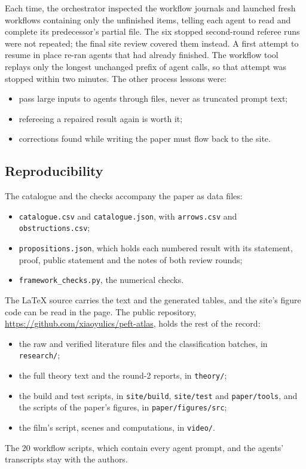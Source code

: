 Each time, the orchestrator inspected the workflow journals and launched fresh workflows containing only the unfinished items, telling each agent to read and complete its predecessor's partial file. The six stopped second-round referee runs were not repeated; the final site review covered them instead. A first attempt to resume in place re-ran agents that had already finished. The workflow tool replays only the longest unchanged prefix of agent calls, so that attempt was stopped within two minutes. The other process lessons were:

\begin{itemize}
\item pass large inputs to agents through files, never as truncated prompt text;
\item refereeing a repaired result again is worth it;
\item corrections found while writing the paper must flow back to the site.
\end{itemize}

\subsection{Reproducibility}

The catalogue and the checks accompany the paper as data files:

\begin{itemize}
\item \texttt{catalogue.csv} and \texttt{catalogue.json}, with \texttt{arrows.csv} and \texttt{obstructions.csv};
\item \texttt{propositions.json}, which holds each numbered result with its statement, proof, public statement and the notes of both review rounds;
\item \texttt{framework\_checks.py}, the numerical checks.
\end{itemize}

The LaTeX source carries the text and the generated tables, and the site's figure code can be read in the page. The public repository, \url{https://github.com/xiaoyulics/peft-atlas}, holds the rest of the record:

\begin{itemize}
\item the raw and verified literature files and the classification batches, in \texttt{research/};
\item the full theory text and the round-2 reports, in \texttt{theory/};
\item the build and test scripts, in \texttt{site/build}, \texttt{site/test} and \texttt{paper/tools}, and the scripts of the paper's figures, in \texttt{paper/figures/src};
\item the film's script, scenes and computations, in \texttt{video/}.
\end{itemize}

The 20 workflow scripts, which contain every agent prompt, and the agents' transcripts stay with the authors.
